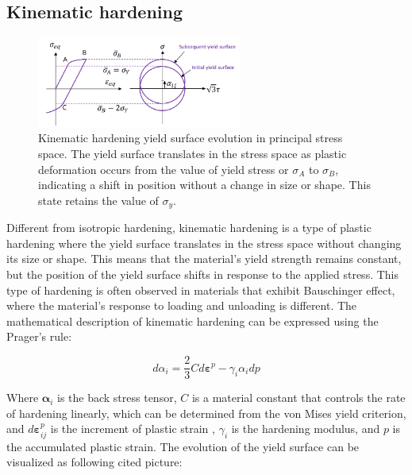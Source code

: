 \documentclass[12pt]{article}
\begin{document}
\subsection{Kinematic hardening}
\begin{figure}[H]
    \centering
    \includegraphics[width=0.6\textwidth]{images/Kinematic_Hardening.png}
    \caption{Kinematic hardening yield surface evolution in principal stress space. 
    The yield surface translates in the stress space as plastic deformation occurs from the 
    value of yield stress or $\sigma_{A}$ to
    $\sigma_{B}$, 
    indicating a shift in position without a change in size or shape. This state retains the
    value of $\sigma_y$. \cite{jahed2021cyclic}}
    \label{fig:kinematic_hardening}
\end{figure}
\hspace{2em}Different from isotropic hardening, kinematic hardening is a type of plastic hardening
where the yield surface translates in the stress space without changing its size or shape. This means that
the material's yield strength remains constant, but the position of the yield surface shifts in response
to the applied stress. This type of hardening is often observed in materials that exhibit
Bauschinger effect, where the material's response to loading and unloading is different. The mathematical
description of kinematic hardening can be expressed using the Prager's rule:

\begin{equation}
    d \alpha_{i} = \frac{2}{3}C d \boldsymbol{\varepsilon}^{p} - \gamma_{i} \alpha_{i} dp
\end{equation}

Where $\boldsymbol{\alpha}_{i}$ is the back stress tensor, $C$ is a material constant that controls 
the rate of hardening linearly, which can be determined from the von Mises yield criterion, and $d \boldsymbol{\varepsilon}_{ij}^{p}$ 
is the increment of plastic strain \cite{jahed2021cyclic}, $\gamma_{i}$ is the hardening modulus, 
and $p$ is the accumulated plastic strain. The evolution of the yield surface can be visualized
as following cited picture:
\end{document}
